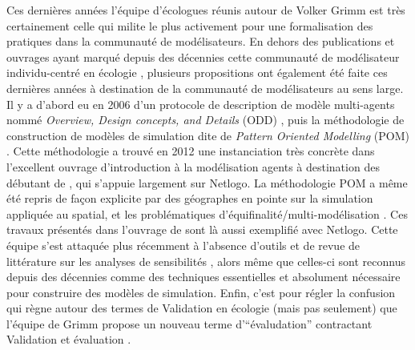 Ces dernières années l'équipe d'écologues réunis autour de Volker Grimm est très certainement celle qui milite le plus activement pour une formalisation des pratiques dans la communauté de modélisateurs. En dehors des publications et ouvrages ayant marqué depuis des décennies cette communauté de modélisateur individu-centré en écologie \autocites{Huston1988,DeAngelis1992,Grimm1999,Grimm2004,DeAngelis2014}, plusieurs propositions ont également été faite ces dernières années à destination de la communauté de modélisateurs au sens large. Il y a d'abord eu en 2006 d'un protocole de description de modèle multi-agents nommé \textit{Overview, Design concepts, and Details} (ODD) \autocite{Grimm2010}, puis la méthodologie de construction de modèles de simulation dite de \textit{Pattern Oriented Modelling} (POM) \autocites{Grimm2005}. Cette méthodologie a trouvé en 2012 une instanciation très concrète dans l'excellent ouvrage d'introduction à la modélisation agents à destination des débutant de \textcite{Railsback2012}, qui s'appuie largement sur Netlogo. La méthodologie POM a même été repris de façon explicite par des géographes en pointe sur la simulation appliquée au spatial, et les problématiques d'équifinalité/multi-modélisation \autocite{OSullivan2004, Millington2012}. Ces travaux présentés dans l'ouvrage de \textcite{OSullivan2013} sont là aussi exemplifié avec Netlogo. Cette équipe s'est attaquée plus récemment à l'absence d'outils et de revue de littérature sur les analyses de sensibilités \autocites{Thiele2012,Thiele2014}, alors même que celles-ci sont reconnus depuis des décennies comme des techniques essentielles et absolument nécessaire pour construire des modèles de simulation. Enfin, c'est pour régler la confusion qui règne autour des termes de Validation en écologie (mais pas seulement) que l'équipe de Grimm propose un nouveau terme d'\enquote{évaludation} contractant Validation et évaluation \autocite{Augusiak2014}. 

